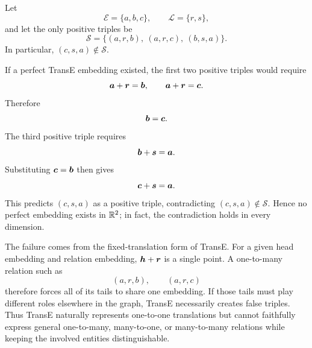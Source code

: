 \begin{solution}
Let
\[
  \mathcal E=\{a,b,c\},\qquad
  \mathcal L=\{r,s\},
\]
and let the only positive triples be
\[
  \mathcal S
  =
  \{(a,r,b),\ (a,r,c),\ (b,s,a)\}.
\]
In particular, \((c,s,a)\notin\mathcal S\).

If a perfect TransE embedding existed, the first two positive triples would
require
\[
  \bm{a}+\bm{r}=\bm{b},
  \qquad
  \bm{a}+\bm{r}=\bm{c}.
\]
Therefore
\[
  \bm{b}=\bm{c}.
\]
The third positive triple requires
\[
  \bm{b}+\bm{s}=\bm{a}.
\]
Substituting \(\bm{c}=\bm{b}\) then gives
\[
  \bm{c}+\bm{s}=\bm{a}.
\]
This predicts \((c,s,a)\) as a positive triple, contradicting
\((c,s,a)\notin\mathcal S\).  Hence no perfect embedding exists in
\(\mathbb{R}^2\); in fact, the contradiction holds in every dimension.

The failure comes from the fixed-translation form of TransE.  For a given
head embedding and relation embedding, \(\bm{h}+\bm{r}\) is a single point.
A one-to-many relation such as
\[
  (a,r,b),\qquad(a,r,c)
\]
therefore forces all of its tails to share one embedding.  If those tails
must play different roles elsewhere in the graph, TransE necessarily creates
false triples.  Thus TransE naturally represents one-to-one translations but
cannot faithfully express general one-to-many, many-to-one, or many-to-many
relations while keeping the involved entities distinguishable.
\end{solution}
